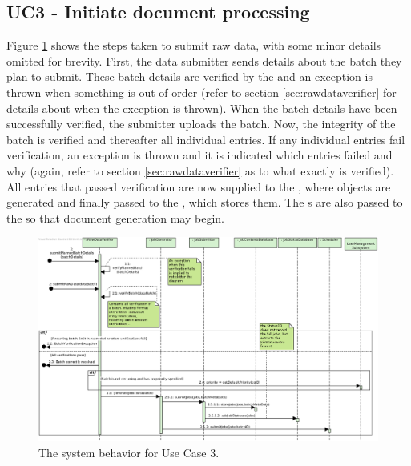 \subsection{UC3 - Initiate document processing}
Figure \ref{fig:seq_uc3} shows the steps taken to submit raw data, with some minor details omitted for brevity. First, the data submitter sends details about the batch they plan to submit. These batch details are verified by the  and an exception is thrown when something is out of order (refer to section \ref{sec:rawdataverifier} for details about when the exception is thrown). When the batch details have been successfully verified, the submitter uploads the batch. Now, the integrity of the batch is verified and thereafter all individual entries. If any individual entries fail verification, an exception is thrown and it is indicated which entries failed and why (again, refer to section \ref{sec:rawdataverifier} as to what exactly is verified). All entries that passed verification are now supplied to the , where  objects are generated and finally passed to the , which stores them. The s are also passed to the  so that document generation may begin. 

\begin{figure}[!htp]
    \centering
    \includegraphics[width=\textwidth]{figures/UC3 - Initiate document processing.png}
    \caption{The system behavior for Use Case 3.
        }\label{fig:seq_uc3}
\end{figure}

